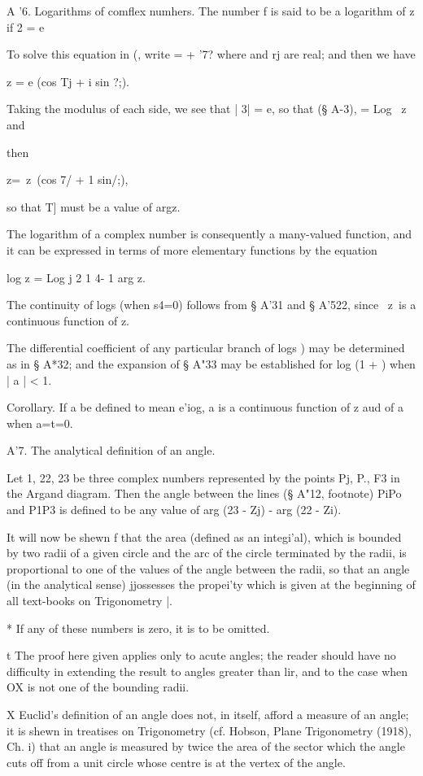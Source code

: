 A '6. Logarithms of comflex numhers. The number f is said to be a
logarithm of z if 2 = e

To solve this equation in (, write = + '7? where and rj are real; and
then we have

z = e (cos Tj + i sin ?;).

Taking the modulus of each side, we see that | 3| = e, so that (§
A-3), = Log \ z\; and

then

z=\ z\ (cos 7/ + 1 sin/;),

so that T] must be a value of argz.

The logarithm of a complex number is consequently a many-valued
function, and it can be expressed in terms of more elementary
functions by the equation

log z = Log j 2 1 4- 1 arg z.

The continuity of logs (when s4=0) follows from § A'31 and § A'522,
since \ z\ is a continuous function of z.

The differential coefficient of any particular branch of logs )
may be determined as in § A*32; and the expansion of § A"33 may be
established for log (1 + ) when | a | < 1.

Corollary. If a be defined to mean e'iog, a is a continuous function
of z aud of a when a=t=0.

A'7. The analytical definition of an angle.

Let 1, 22, 23 be three complex numbers represented by the points Pj,
P., F3 in the Argand diagram. Then the angle between the lines (§
A"12, footnote) PiPo and P1P3 is defined to be any value of arg (23 -
Zj) - arg (22 - Zi).

It will now be shewn f that the area (defined as an integi'al), which
is bounded by two radii of a given circle and the arc of the circle
terminated by the radii, is proportional to one of the values of the
angle between the radii, so that an angle (in the analytical sense)
jjossesses the propei'ty which is given at the beginning of all
text-books on Trigonometry |.

* If any of these numbers is zero, it is to be omitted.

t The proof here given applies only to acute angles; the reader
should have no difficulty in extending the result to angles greater
than lir, and to the case when OX is not one of the bounding radii.

X Euclid's definition of an angle does not, in itself, afford a
measure of an angle; it is shewn in treatises on Trigonometry (cf.
Hobson, Plane Trigonometry (1918), Ch. i) that an angle is measured by
twice the area of the sector which the angle cuts off from a unit
circle whose centre is at the vertex of the angle.

